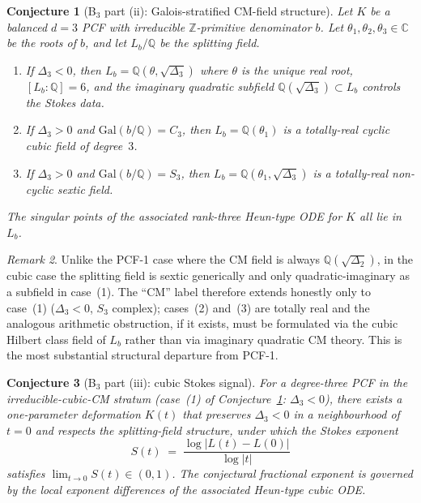 \documentclass[11pt,a4paper]{article}
\newtheorem{conjecture}{Conjecture}
\theoremstyle{definition}
\theoremstyle{remark}
\newtheorem{remark}[conjecture]{Remark}
\newcommand{\Q}{\mathbb{Q}}
\newcommand{\Z}{\mathbb{Z}}
\newcommand{\C}{\mathbb{C}}
\newcommand{\Gal}{\mathrm{Gal}}
\begin{document}
\begin{conjecture}[B$_{3}$ part (ii): Galois-stratified CM-field structure]\label{conj:B2}
Let $K$ be a balanced $d=3$ PCF with irreducible $\Z$-primitive
denominator $b$. Let $\theta_{1},\theta_{2},\theta_{3}\in\C$ be the roots
of $b$, and let $L_{b}/\Q$ be the splitting field.
\begin{enumerate}
\item If $\Delta_{3}<0$, then $L_{b}=\Q(\theta,\sqrt{\Delta_{3}})$ where
$\theta$ is the unique real root, $[L_{b}:\Q]=6$, and the imaginary
quadratic subfield $\Q(\sqrt{\Delta_{3}})\subset L_{b}$ controls the
Stokes data.
\item If $\Delta_{3}>0$ and $\Gal(b/\Q)=C_{3}$, then $L_{b}=\Q(\theta_{1})$
is a totally-real cyclic cubic field of degree~$3$.
\item If $\Delta_{3}>0$ and $\Gal(b/\Q)=S_{3}$, then $L_{b}=\Q(\theta_{1},\sqrt{\Delta_{3}})$
is a totally-real non-cyclic sextic field.
\end{enumerate}
The singular points of the associated rank-three Heun-type ODE for $K$
all lie in $L_{b}$.
\end{conjecture}

\begin{remark}\label{rem:not-binary}
Unlike the PCF-1 case where the CM field is always
$\Q(\sqrt{\Delta_{2}})$, in the cubic case the splitting field is sextic
generically and only quadratic-imaginary as a subfield in case~(1). The
``CM'' label therefore extends honestly only to case~(1)
($\Delta_{3}<0$, $S_{3}$ complex); cases~(2) and~(3) are totally real
and the analogous arithmetic obstruction, if it exists, must be
formulated via the cubic Hilbert class field of $L_{b}$ rather than via
imaginary quadratic CM theory. This is the most substantial structural
departure from PCF-1.
\end{remark}

\begin{conjecture}[B$_{3}$ part (iii): cubic Stokes signal]\label{conj:B3}
For a degree-three PCF in the irreducible-cubic-CM stratum (case~(1) of
Conjecture~\ref{conj:B2}: $\Delta_{3}<0$), there exists a one-parameter
deformation $K(t)$ that preserves $\Delta_{3}<0$ in a neighbourhood of
$t=0$ and respects the splitting-field structure, under which the Stokes
exponent
\[
S(t)\;=\;\frac{\log|L(t)-L(0)|}{\log|t|}
\]
satisfies $\lim_{t\to 0}S(t)\in(0,1)$. The conjectural fractional
exponent is governed by the local exponent differences of the
associated Heun-type cubic ODE.
\end{conjecture}
\end{document}
